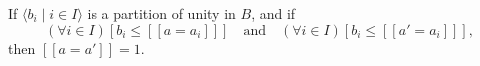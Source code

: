 If $\langle b_i \mid i \in I \rangle$ is a partition of unity in $B$, and if
$$(\forall i \in I)[b_i \leq [\![a = a_i]\!]] \quad \text{and} \quad (\forall i \in I)[b_i \leq [\![a' = a_i]\!]],$$
then $[\![a = a']\!] = 1$.
